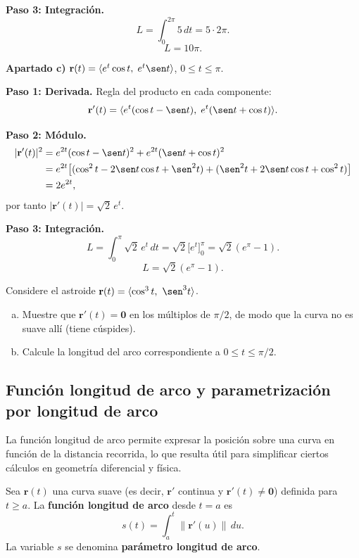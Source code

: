 \begin{prob}
\begin{myproof}
\textbf{Paso 3: Integración.}
\[
  L = \int_0^{2\pi}5\,dt = 5\cdot 2\pi.
\]
\[
  \boxed{L = 10\pi.}
\]

\textbf{Apartado c)} $\mathbf{r}(t)=\langle e^t\cos t,\;e^t\sen t\rangle$, $0\le t\le\pi$.

\textbf{Paso 1: Derivada.} Regla del producto en cada componente:
\[
  \mathbf{r}'(t)=\langle e^t(\cos t-\sen t),\;e^t(\sen t+\cos t)\rangle.
\]

\textbf{Paso 2: Módulo.}
\begin{align*}
  |\mathbf{r}'(t)|^2
  &= e^{2t}(\cos t-\sen t)^2+e^{2t}(\sen t+\cos t)^2 \\
  &= e^{2t}\bigl[(\cos^2t-2\sen t\cos t+\sen^2t)
                +(\sen^2t+2\sen t\cos t+\cos^2t)\bigr] \\
  &= 2e^{2t},
\end{align*}
por tanto $|\mathbf{r}'(t)|=\sqrt{2}\,e^t$.

\textbf{Paso 3: Integración.}
\[
  L = \int_0^{\pi}\sqrt{2}\,e^t\,dt = \sqrt{2}\bigl[e^t\bigr]_0^{\pi}=\sqrt{2}(e^{\pi}-1).
\]
\[
  \boxed{L=\sqrt{2}(e^{\pi}-1).}
\]
\end{myproof}
\end{prob}

\begin{prob}
Considere el astroide $\mathbf r(t)=\langle \cos^3 t,\ \sen^3 t\rangle$.
\begin{enumerate}[a)]
  \item Muestre que $\mathbf r'(t)=\mathbf 0$ en los múltiplos de $\pi/2$, de
        modo que la curva no es suave allí (tiene cúspides).
  \item Calcule la longitud del arco correspondiente a $0\le t\le\pi/2$.
\end{enumerate}
\end{prob}

\subsection{Función longitud de arco y parametrización por longitud de arco}

La función longitud de arco permite expresar la posición sobre una curva
en función de la distancia recorrida, lo que resulta útil para
simplificar ciertos cálculos en geometría diferencial y física.

\begin{definition}
Sea $\mathbf{r}(t)$ una curva suave (es decir, $\mathbf{r}'$ continua y
$\mathbf{r}'(t) \neq \mathbf{0}$) definida para $t \geq a$. La
\textbf{función longitud de arco} desde $t = a$ es
\[
s(t) = \int_a^t \|\mathbf{r}'(u)\|\,du.
\]
La variable $s$ se denomina \textbf{parámetro longitud de arco}.
\end{definition}

